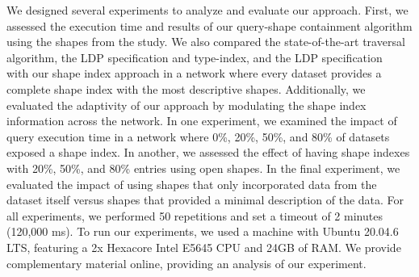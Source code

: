 We designed several experiments to analyze and evaluate our approach.
First, we assessed the execution time and results of our query-shape containment algorithm using the shapes from the study.
We also compared the state-of-the-art traversal algorithm, the LDP specification and type-index, and the LDP specification~\cite{Taelman2023} with our shape index approach in a network where every dataset provides a complete shape index with the most descriptive shapes.
Additionally, we evaluated the adaptivity of our approach by modulating the shape index information across the network.
In one experiment, we examined the impact of query execution time in a network where 0\%, 20\%, 50\%, and 80\% of datasets exposed a shape index.
In another, we assessed the effect of having shape indexes with 20\%, 50\%, and 80\% entries using open shapes.
In the final experiment, we evaluated the impact of using shapes that only incorporated data from the dataset itself versus shapes that provided a minimal description of the data.
For all experiments, we performed 50 repetitions and set a timeout of 2 minutes (120,000 ms).
To run our experiments, we used a machine with Ubuntu 20.04.6 LTS, featuring a 2x Hexacore Intel E5645 CPU and 24GB of RAM.
We provide complementary material online, providing an analysis of our experiment.~

\iffalse
PROVIDE LINK FOR EXPERIMENTS AND SHAPES

102x pcgen3 nodes
https://doc.ilabt.imec.be/ilabt/virtualwall/hardware.html#virtual-wall-2
\fi
